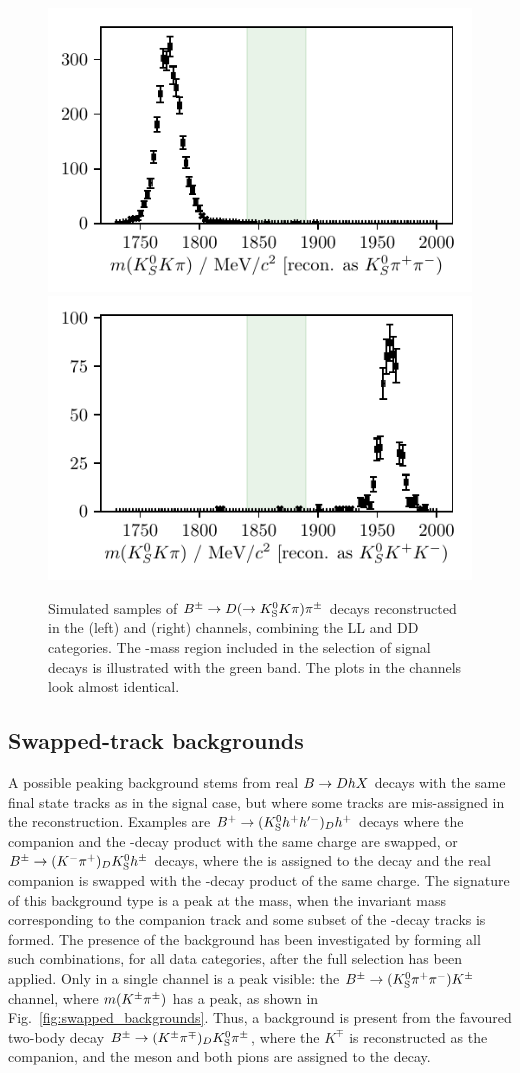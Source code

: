 \begin{figure}[tbp]
    \centering
    \includegraphics[width=0.45\columnwidth]{figures/analysis/background_checks/pretty_KsKpi_check_PiPi.pdf}
    \includegraphics[width=0.45\columnwidth]{figures/analysis/background_checks/pretty_KsKpi_check_KK.pdf}
    \caption{Simulated samples of ${{B}^\pm}\rightarrow{\ensuremath{D}}(\rightarrow{\ensuremath{{K}^0_{\mathrm{S}}}}{\ensuremath{K}}\pi)\pi^\pm$ decays reconstructed in the (left) \DtoKspipi and (right) \DtoKsKK channels, combining the LL and DD categories. The \D-mass region included in the selection of signal decays is illustrated with the green band. The plots in the \BtoDK channels look almost identical.}
    \label{fig:KsKpi}
\end{figure}





\subsection{Swapped-track backgrounds} %
\label{sub:swapped_track_backgrounds}

A possible peaking background stems from real ${B}\rightarrow{\ensuremath{D}} h X$ decays with the same final state tracks as in the signal case, but where some tracks are mis-assigned in the reconstruction. Examples are ${{{B}^+}}\rightarrow({{K}^0_{\mathrm{S}}} h^+h'^-)_Dh^+$ decays where the companion and the \D-decay product with the same charge are swapped, or ${{B}^\pm}\rightarrow(K^-{{\pi}^+})_D {{K}^0_{\mathrm{S}}} h^\pm$ decays, where the \KS is assigned to the \D decay and the real companion is swapped with the \D-decay product of the same charge. 
The signature of this background type is a peak at the \D mass, when the invariant mass corresponding to the companion track and some subset of the \D-decay tracks is formed. The presence of the background has been investigated by forming all such combinations, for all data categories, after the full selection has been applied. Only in a single channel is a peak visible: the ${{B}^\pm}\rightarrow({{K}^0_{\mathrm{S}}}{{\pi}^+}{{\pi}^-}){{K}^\pm}$ channel, where $m({{K}^\pm}{{\pi}^\pm})$ has a peak, as shown in Fig.~\ref{fig:swapped_backgrounds}. Thus, a background is present from the favoured two-body \D decay ${{B}^\pm}\rightarrow(K^\pm{\ensuremath{{\pi}^\mp}})_D {{K}^0_{\mathrm{S}}} {{\pi}^\pm}$, where the $K^\mp$ is reconstructed as the companion, and the \Ks meson and both pions are assigned to the \D decay. 

